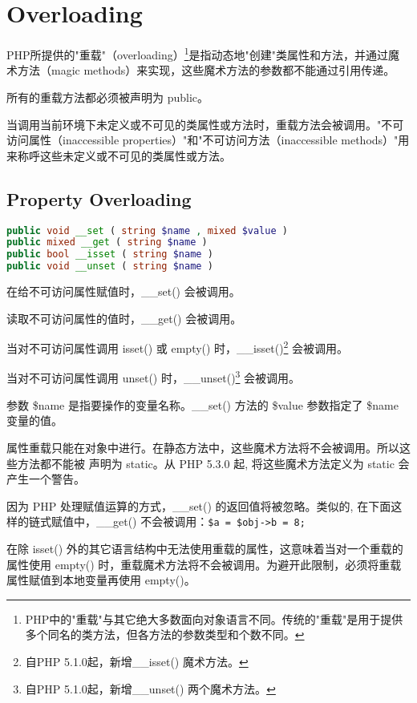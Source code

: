 \chapter{Overloading}



PHP所提供的"重载"（overloading）\footnote{PHP中的"重载"与其它绝大多数面向对象语言不同。传统的"重载"是用于提供多个同名的类方法，但各方法的参数类型和个数不同。}是指动态地"创建"类属性和方法，并通过魔术方法（magic methods）来实现，这些魔术方法的参数都不能通过引用传递。

所有的重载方法都必须被声明为 public。

当调用当前环境下未定义或不可见的类属性或方法时，重载方法会被调用。"不可访问属性（inaccessible properties）"和"不可访问方法（inaccessible methods）"用来称呼这些未定义或不可见的类属性或方法。


\section{Property Overloading}


\begin{lstlisting}[language=PHP]
public void __set ( string $name , mixed $value )
public mixed __get ( string $name )
public bool __isset ( string $name )
public void __unset ( string $name )
\end{lstlisting}

在给不可访问属性赋值时，\_\_set() 会被调用。

读取不可访问属性的值时，\_\_get() 会被调用。

当对不可访问属性调用 isset() 或 empty() 时，\_\_isset()\footnote{自PHP 5.1.0起，新增\_\_isset() 魔术方法。} 会被调用。

当对不可访问属性调用 unset() 时，\_\_unset()\footnote{自PHP 5.1.0起，新增\_\_unset() 两个魔术方法。} 会被调用。

参数 \$name 是指要操作的变量名称。\_\_set() 方法的 \$value 参数指定了 \$name 变量的值。

属性重载只能在对象中进行。在静态方法中，这些魔术方法将不会被调用。所以这些方法都不能被 声明为 static。从 PHP 5.3.0 起, 将这些魔术方法定义为 static 会产生一个警告。

因为 PHP 处理赋值运算的方式，\_\_set() 的返回值将被忽略。类似的, 在下面这样的链式赋值中，\_\_get() 不会被调用：\verb|$a = $obj->b = 8; |


在除 isset() 外的其它语言结构中无法使用重载的属性，这意味着当对一个重载的属性使用 empty() 时，重载魔术方法将不会被调用。为避开此限制，必须将重载属性赋值到本地变量再使用 empty()。


